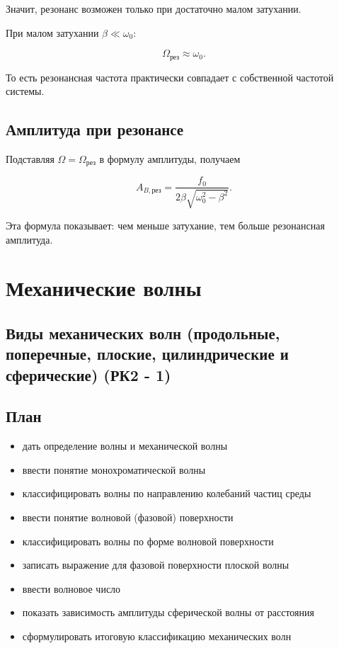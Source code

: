 \documentclass[a4paper,12pt]{article}
\begin{document}
Значит, резонанс возможен только при достаточно малом затухании.

При малом затухании $\beta\ll\omega_0$:

\[
\Omega_{\text{рез}}\approx\omega_0.
\]

То есть резонансная частота практически совпадает с собственной частотой системы.

\subsection*{Амплитуда при резонансе}   

Подставляя $\Omega=\Omega_{\text{рез}}$ в формулу амплитуды, получаем

\[
A_{B,\text{рез}}=
\frac{f_0}{2\beta\sqrt{\omega_0^2-\beta^2}}.
\]

Эта формула показывает: чем меньше затухание, тем больше резонансная амплитуда.

\section{Механические волны}

\subsection{Виды механических волн (продольные, поперечные, плоские, цилиндрические и сферические) (РК2 - 1)}

\subsection*{План}
\begin{itemize}
\item дать определение волны и механической волны
\item ввести понятие монохроматической волны
\item классифицировать волны по направлению колебаний частиц среды
\item ввести понятие волновой (фазовой) поверхности
\item классифицировать волны по форме волновой поверхности
\item записать выражение для фазовой поверхности плоской волны
\item ввести волновое число
\item показать зависимость амплитуды сферической волны от расстояния
\item сформулировать итоговую классификацию механических волн
\end{itemize}
\end{document}

